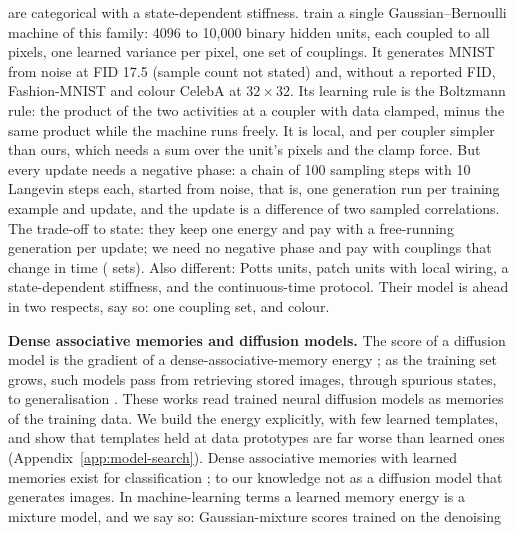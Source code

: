 \begin{plan}
        are categorical with a state-dependent stiffness.
        \citet{liao2022gaussian} train a single Gaussian--Bernoulli machine of
        this family: 4096 to 10{,}000 binary hidden units, each coupled to all
        pixels, one learned variance per pixel, one set of couplings. It
        generates MNIST from noise at FID 17.5 (sample count not stated) and,
        without a reported FID, Fashion-MNIST and colour CelebA at
        $32\times32$. Its learning rule is the Boltzmann rule: the product of
        the two activities at a coupler with data clamped, minus the same
        product while the machine runs freely. It is local, and per coupler
        simpler than ours, which needs a sum over the unit's pixels and the
        clamp force. But every update needs a negative phase: a chain of 100
        sampling steps with 10 Langevin steps each, started from noise, that
        is, one generation run per training example and update, and the
        update is a difference of two sampled correlations.
        The trade-off to state: they keep one energy and pay with a
        free-running generation per update; we need no negative phase and pay
        with couplings that change in time (\nSlices{} sets). Also different:
        Potts units, patch units with local wiring, a state-dependent
        stiffness, and the continuous-time protocol. Their model is ahead in
        two respects, say so: one coupling set, and colour.
  \item \textbf{Dense associative memories and diffusion models.} The score of
        a diffusion model is the gradient of a dense-associative-memory energy
        \citep{hoover2023memory,ambrogioni2024search}; as the training set
        grows, such models pass from retrieving stored images, through
        spurious states, to generalisation \citep{pham2026emergence}. These
        works read trained neural diffusion models as memories of the training
        data. We build the energy explicitly, with few learned templates, and
        show that templates held at data prototypes are far worse than learned
        ones (Appendix~\ref{app:model-search}).
        Dense associative memories with learned memories exist for
        classification \citep{krotov2016dense}; to our knowledge not as a
        diffusion model that generates images.
        In machine-learning terms a learned memory energy is a mixture model,
        and we say so: Gaussian-mixture scores trained on the denoising

\end{plan}
